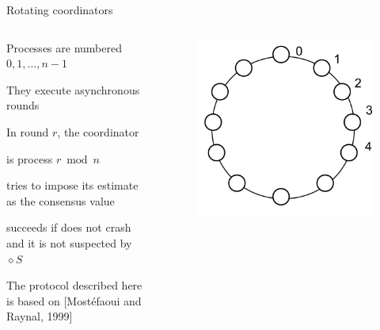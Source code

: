 \begin{frame}{Rotating coordinators}
	
\begin{columns}
\begin{column}{0.6\textwidth}
\BIL
\item Processes are numbered $0, 1, \ldots, n-1$
\item They execute asynchronous rounds
\item In round $r$, the coordinator
  \BI
  \item is process $r \bmod n$
  \item tries to impose its estimate as the consensus value
  \item succeeds if does not crash and it is not suspected by $\diamond S$
  \EI
\item The protocol described here is based on [Mostéfaoui and Raynal, 1999]
\EIL
\end{column}
\begin{column}{0.4\textwidth}
	\begin{figure}
		\begin{overprint}
			\includegraphics[width=\textwidth]{figs/07/rotating0}

\end{overprint}
\end{figure}
\end{column}
\end{columns}
\end{frame}
